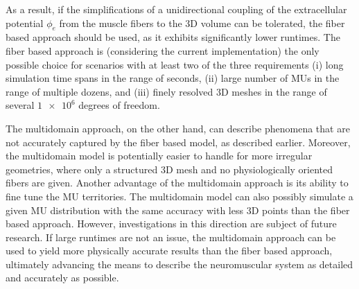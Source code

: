 As a result, if the simplifications of a unidirectional coupling of the extracellular potential $\phi_e$ from the muscle fibers to the 3D volume can be tolerated, the fiber based approach should be used, as it exhibits significantly lower runtimes. The fiber based approach is (considering the current implementation) the only possible choice for scenarios with at least two of the three requirements (i) long simulation time spans in the range of seconds, (ii) large number of MUs in the range of multiple dozens, and (iii) finely resolved 3D meshes in the range of several $\num{1e6}$ degrees of freedom.
 
The multidomain approach, on the other hand, can describe phenomena that are not accurately captured by the fiber based model, as described earlier.
Moreover, the multidomain model is potentially easier to handle for more irregular geometries, where only a structured 3D mesh and no physiologically oriented fibers are given. Another advantage of the multidomain approach is its ability to fine tune the MU territories. 
The multidomain model can also possibly simulate a given MU distribution with the same accuracy with less 3D points than the fiber based approach. However, investigations in this direction are subject of future research.
If large runtimes are not an issue, the multidomain approach can be used to yield more physically accurate results than the fiber based approach, ultimately advancing the means to describe the neuromuscular system as detailed and accurately as possible.







